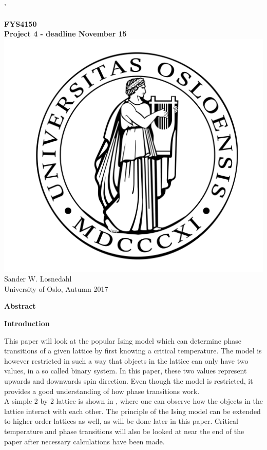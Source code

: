 \documentclass[10pt,a4paper]{article}
\begin{document}
'
\begin{center}
{\LARGE\bf
FYS4150\\
Project 4 - deadline November 15
}
\\
 \includegraphics[scale=0.1]{uio.png}\\
Sander W. Losnedahl\\
University of Oslo, Autumn 2017
 
\end{center}

\begin{center}
{\Large\bf Abstract}
\end{center}


\newpage

\begin{center}
{\LARGE\bf Introduction}
\end{center}

\noindent This paper will look at the popular Ising model which can determine phase transitions of a given lattice by first knowing a critical temperature. The model is however restricted in such a way that objects in the lattice can only have two values, in a so called binary system. In this paper, these two values represent upwards and downwards spin direction. Even though the model is restricted, it provides a good understanding of how phase transitions work.
\\
A simple 2 by 2 lattice is shown in , where one can observe how the objects in the lattice interact with each other. The principle of the Ising model can be extended to higher order lattices as well, as will be done later in this paper. Critical temperature and phase transitions will also be looked at near the end of the paper after necessary calculations have been made.
\end{document}
